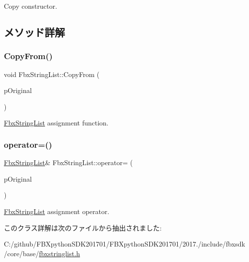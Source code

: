 Copy constructor. 



\subsection{メソッド詳解}
\mbox{\label{class_fbx_string_list_a7d488c296b284ff595d9ab31b34d4702}} 
\subsubsection{\texorpdfstring{Copy\+From()}{CopyFrom()}}
{\footnotesize\ttfamily void Fbx\+String\+List\+::\+Copy\+From (\begin{DoxyParamCaption}\item[{const \hyperlink{class_fbx_string_list}{Fbx\+String\+List} $\ast$}]{p\+Original }\end{DoxyParamCaption})}



\hyperlink{class_fbx_string_list}{Fbx\+String\+List} assignment function. 

\mbox{\label{class_fbx_string_list_a01f1736c5ba0e59ebfb601e620d8555f}} 
\subsubsection{\texorpdfstring{operator=()}{operator=()}}
{\footnotesize\ttfamily \hyperlink{class_fbx_string_list}{Fbx\+String\+List}\& Fbx\+String\+List\+::operator= (\begin{DoxyParamCaption}\item[{const \hyperlink{class_fbx_string_list}{Fbx\+String\+List} \&}]{p\+Original }\end{DoxyParamCaption})}



\hyperlink{class_fbx_string_list}{Fbx\+String\+List} assignment operator. 



このクラス詳解は次のファイルから抽出されました\+:\begin{DoxyCompactItemize}
\item 
C\+:/github/\+F\+B\+Xpython\+S\+D\+K201701/\+F\+B\+Xpython\+S\+D\+K201701/2017./include/fbxsdk/core/base/\hyperlink{fbxstringlist_8h}{fbxstringlist.\+h}\end{DoxyCompactItemize}
